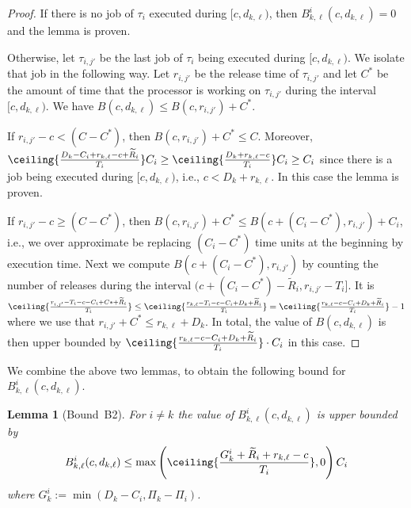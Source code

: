 \documentclass[conference]{IEEEtran}
\newtheorem{lem}[thm]{Lemma}
\theoremstyle{definition}
\theoremstyle{remark}
\newcommand{\Rtilde}{\widetilde{R}}
\begin{document}
	\begin{proof}
		If there is no job of $\tau_i$ executed during $[c,d_{k,\ell})$, then $B^i_{k,\ell}(c,d_{k,\ell})=0$ and the lemma is proven.
		
		Otherwise, let $\tau_{i,j'}$ be the last job of $\tau_i$ being executed during $[c,d_{k,\ell})$.
		We isolate that job in the following way.
		Let $r_{i,j'}$ be the release time of $\tau_{i,j'}$ and let $C^*$ be the amount of time that the processor is working on $\tau_{i,j'}$ during the interval $[c,d_{k,\ell})$.
		We have $B(c,d_{k,\ell}) \leq B(c,r_{i,j'}) + C^*.$
		
		If $r_{i,j'}-c < (C-C^*)$, then $B(c,r_{i,j'}) + C^* \leq C$.
		Moreover, $\ceiling{\frac{D_k-C_i+r_{k,\ell}-c+\Rtilde_i}{T_i}}C_i \geq \ceiling{\frac{D_k+r_{k,\ell}-c}{T_i}}C_i \geq C_i$ since there is a job being executed during $[c, d_{k,\ell})$, i.e., $c < D_k+r_{k,\ell}$.
		In this case the lemma is proven.
		
		If $r_{i,j'}-c \geq (C-C^*)$, then $B(c,r_{i,j'}) + C^* \leq B(c + (C_i-C^*),r_{i,j'}) + C_i$, i.e., we over approximate be replacing $(C_i-C^*)$ time units at the beginning by execution time.
		Next we compute $B(c + (C_i-C^*),r_{i,j'})$ by counting the number of releases during the interval $(c+(C_i-C^*)-\Rtilde_i, r_{i,j'}-T_i]$.
		It is 
		$
			\ceiling{\frac{r_{i,j'}-T_i-c-C_i+C*+\Rtilde_i}{T_i}} 
			\leq \ceiling{\frac{r_{k,\ell}-T_i-c-C_i+D_k+\Rtilde_i}{T_i}}
			= \ceiling{\frac{r_{k,\ell}-c-C_i+D_k+\Rtilde_i}{T_i}} -1
		$
		where we use that $r_{i,j'} + C^* \leq r_{k,\ell} + D_k$.
		In total, the value of $B(c,d_{k,\ell})$ is then upper bounded by $\ceiling{\frac{r_{k,\ell}-c-C_i+D_k+\Rtilde_i}{T_i}} \cdot C_i$ in this case.
	\end{proof}
	
	We combine the above two lemmas, to obtain the following bound for $B_{k,\ell}^i(c,d_{k,\ell})$.
	
	\begin{lem}[Bound~B2]\label{lem:total_bound_interference}
		For $i\neq k$ the value of  $B_{k,\ell}^i(c,d_{k,\ell})$ is upper bounded by
		\begin{equation}\label{eq:total_bound_interference}
			B_{k,\ell}^i (c,d_{k,\ell}) \leq
				\max\left(\ceiling{\frac{G_{k}^i+\Rtilde_i+r_{k,\ell}-c}{T_i}}, 0\right)C_i
		\end{equation}
		where $G_k^i:= \min(D_k-C_i, \Pi_k-\Pi_i)$.
	\end{lem}
\end{document}
